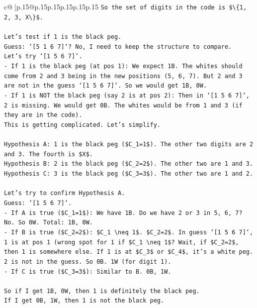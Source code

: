 \documentclass{article}
\begin{document}
{\begin{supertabular}{c@{$\;$}|p{.15\linewidth}@{}p{.15\linewidth}p{.15\linewidth}p{.15\linewidth}p{.15\linewidth}p{.15\linewidth}}
{{{\texttt{So the set of digits in the code is \$\textbackslash{}\{1, 2, 3, X\textbackslash{}\}\$.} \\
\\ 
\texttt{Let's test if 1 is the black peg.} \\
\texttt{Guess: `{[}5 1 6 7{]}`? No, I need to keep the structure to compare.} \\
\texttt{Let's try `{[}1 5 6 7{]}`.} \\
\texttt{{-} If 1 is the black peg (at pos 1): We expect 1B. The whites should come from 2 and 3 being in the new positions (5, 6, 7). But 2 and 3 are not in the guess `{[}1 5 6 7{]}`. So we would get 1B, 0W.} \\
\texttt{{-} If 1 is NOT the black peg (say 2 is at pos 2): Then in `{[}1 5 6 7{]}`, 2 is missing. We would get 0B. The whites would be from 1 and 3 (if they are in the code).} \\
\texttt{This is getting complicated. Let's simplify.} \\
\\ 
\texttt{Hypothesis A: 1 is the black peg (\$C\_1=1\$). The other two digits are 2 and 3. The fourth is \$X\$.} \\
\texttt{Hypothesis B: 2 is the black peg (\$C\_2=2\$). The other two are 1 and 3.} \\
\texttt{Hypothesis C: 3 is the black peg (\$C\_3=3\$). The other two are 1 and 2.} \\
\\ 
\texttt{Let's try to confirm Hypothesis A.} \\
\texttt{Guess: `{[}1 5 6 7{]}`.} \\
\texttt{{-} If A is true (\$C\_1=1\$): We have 1B. Do we have 2 or 3 in 5, 6, 7? No. So 0W. Total: 1B, 0W.} \\
\texttt{{-} If B is true (\$C\_2=2\$): \$C\_1 \textbackslash{}neq 1\$. \$C\_2=2\$. In guess `{[}1 5 6 7{]}`, 1 is at pos 1 (wrong spot for 1 if \$C\_1 \textbackslash{}neq 1\$? Wait, if \$C\_2=2\$, then 1 is somewhere else. If 1 is at \$C\_3\$ or \$C\_4\$, it's a white peg. 2 is not in the guess. So 0B. 1W (for digit 1).} \\
\texttt{{-} If C is true (\$C\_3=3\$): Similar to B. 0B, 1W.} \\
\\ 
\texttt{So if I get 1B, 0W, then 1 is definitely the black peg.} \\
\texttt{If I get 0B, 1W, then 1 is not the black peg.} \\
\\ 
}}}
\end{supertabular}}
\end{document}
